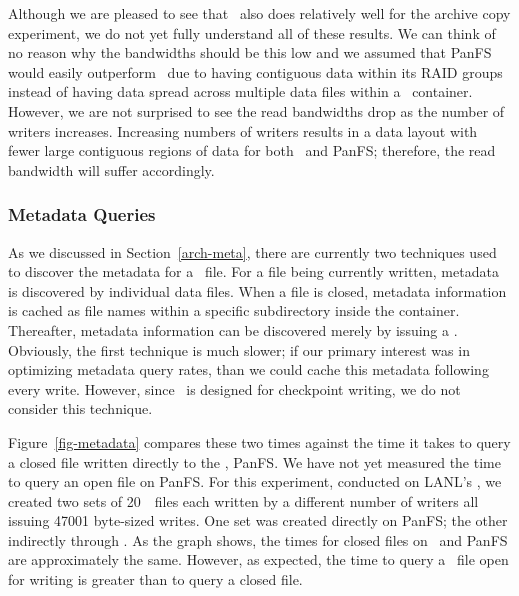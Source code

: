 Although we are pleased to see that \plfs\ also does relatively well for the
archive copy experiment, we do not yet fully understand all of these results.
We can think of no reason why the bandwidths should be this low and we assumed
that PanFS would easily outperform \plfs\ due to having contiguous data within
its RAID groups instead of having data spread across multiple data files
within a \plfs\ container.  However, we are not surprised to see the read
bandwidths drop as the number of writers increases.  Increasing numbers of
writers results in a data layout with fewer large contiguous regions of data
for both \plfs\ and PanFS; therefore, the read bandwidth will suffer
accordingly.


\subsubsection{Metadata Queries}

As we discussed in Section~\ref{arch-meta}, there are currently two techniques
used to discover the metadata for a \plfs\ file. For a file being currently
written, metadata is discovered by  individual data files.
When a file is closed, metadata information is cached as file names within a
specific subdirectory inside the container. Thereafter, metadata information
can be discovered merely by issuing a . Obviously, the first
technique is much slower; if our primary interest was in optimizing metadata
query rates, than we could cache this metadata following every write. However,
since \plfs\ is designed for checkpoint writing, we do not consider this
technique.

Figure~\ref{fig-metadata} compares these two times against the time it takes to
query a closed file written directly to the \upfs, PanFS. We have not yet
measured the time to query an open file on PanFS. For this experiment,
conducted on LANL's \rrz, we created two sets of 20~\GB\ files each written by
a different number of writers all issuing 47001 byte-sized writes. One set was
created directly on PanFS; the other indirectly through \plfs.  As the graph
shows, the  times for closed files on \plfs\ and PanFS are
approximately the same.  However, as expected, the time to query a \plfs\ file
open for writing is greater than to query a closed file.




